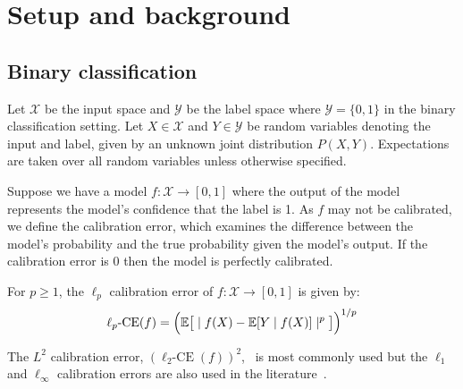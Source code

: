 \section{Setup and background}
\label{sec:formulation}

\newcommand{\lpce}[0]{\ensuremath{\ell_p\mbox{-CE}}}
\newcommand{\ltwoce}[0]{\ensuremath{\ell_2\mbox{-CE}}}
\newcommand{\lsquared}[0]{\ensuremath{L^2}}
\newcommand{\squaredce}[0]{\ensuremath{L^2\mbox{-CE}}}
\newcommand{\topsquaredce}[0]{\ensuremath{L^2\mbox{-TCE}}}
\newcommand{\margsquaredce}[0]{\ensuremath{L^2\mbox{-MCE}}}

\subsection{Binary classification}

Let $\mathcal{X}$ be the input space and $\mathcal{Y}$ be the label space where $\mathcal{Y} = \{0, 1\}$ in the binary classification setting.
Let $X \in \mathcal{X}$ and $Y \in \mathcal{Y}$ be random variables denoting the input and label, given by an unknown joint distribution $P(X, Y)$. Expectations are taken over all random variables unless otherwise specified.

Suppose we have a model $f : \mathcal{X} \to [0, 1]$ where the output of the model represents the model's confidence that the label is 1. As $f$ may not be calibrated, we define the calibration error, which examines the difference between the model's probability and the true probability given the model's output. If the calibration error is $0$ then the model is perfectly calibrated.

\begin{definition}
For $p \geq 1$, the $\ell_p$ calibration error of $f : \mathcal{X} \to [0, 1]$ is given by:
\begin{align}
\lpce(f) = \Big(\expect\big[ \mid f(X) - \expect[Y \; | \; f(X)] \mid^p \big] \Big)^{1/p}
\end{align}
\end{definition}

The $\lsquared$ calibration error, $(\ltwoce(f))^2$,~\cite{murphy1973vector,murphy1977reliability,degroot1983forecasters, nguyen2015posterior, hendrycks2019anomaly, kuleshov2015calibrated, hendrycks2019pretraining, brocker2012empirical} is most commonly used but the $\ell_1$ and $\ell_{\infty}$ calibration errors are also used in the literature~\cite{guo2017calibration, naeini2015obtaining, nixon2019calibration}.

